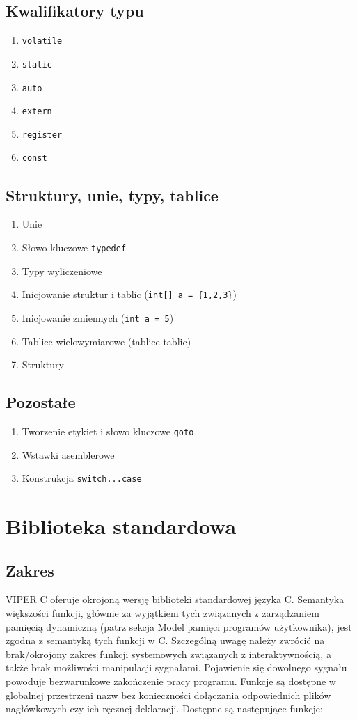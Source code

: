 \documentclass[a4paper,twoside,openright,11pt]{report}
\begin{document}
  \subsection {Kwalifikatory typu}
    \begin{enumerate}
      \item \texttt{volatile}
      \item \texttt{static}
      \item \texttt{auto}
      \item \texttt{extern}
      \item \texttt{register}
      \item \texttt{const}
    \end{enumerate}
  \subsection {Struktury, unie, typy, tablice}
    \begin{enumerate}
      \item Unie
      \item Słowo kluczowe \texttt{typedef}
      \item Typy wyliczeniowe
      \item Inicjowanie struktur i tablic (\texttt{int[] a = \{1,2,3\}})
      \item Inicjowanie zmiennych (\texttt{int a = 5})
      \item Tablice wielowymiarowe (tablice tablic) 
      \item Struktury
    \end{enumerate}
  \subsection {Pozostałe}
    \begin{enumerate}
      \item Tworzenie etykiet i słowo kluczowe \texttt{goto}
      \item Wstawki asemblerowe
      \item Konstrukcja \texttt{switch...case}
    \end{enumerate}

  \section {Biblioteka standardowa}
  \subsection {Zakres}
  \par VIPER C oferuje okrojoną wersję biblioteki standardowej języka C. Semantyka większości funkcji, głównie za wyjątkiem tych związanych z zarządzaniem pamięcią dynamiczną (patrz sekcja Model pamięci programów użytkownika), jest zgodna z semantyką tych funkcji w C. Szczególną uwagę należy zwrócić na brak/okrojony zakres funkcji systemowych związanych z interaktywnością, a także brak możliwości manipulacji sygnałami. Pojawienie się dowolnego sygnału powoduje bezwarunkowe zakończenie pracy programu. Funkcje są dostępne w globalnej przestrzeni nazw bez konieczności dołączania odpowiednich plików nagłówkowych czy ich ręcznej deklaracji. Dostępne są następujące funkcje:
\end{document}
